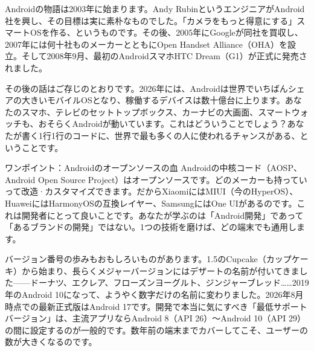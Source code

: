 


Androidの物語は2003年に始まります。Andy RubinというエンジニアがAndroid社を興し、その目標は実に素朴なものでした。「カメラをもっと得意にする」スマートOSを作る、というものです。その後、2005年にGoogleが同社を買収し、2007年には何十社ものメーカーとともにOpen Handset Alliance（OHA）を設立。そして2008年9月、最初のAndroidスマホHTC Dream（G1）が正式に発売されました。

その後の話はご存じのとおりです。2026年には、Androidは世界でいちばんシェアの大きいモバイルOSとなり、稼働するデバイスは数十億台に上ります。あなたのスマホ、テレビのセットトップボックス、カーナビの大画面、スマートウォッチも、おそらくAndroidが動いています。これはどういうことでしょう？あなたが書く1行1行のコードに、世界で最も多くの人に使われるチャンスがある、ということです。

\begin{tcbinfo}{ワンポイント：Androidのオープンソースの血}
Androidの中核コード（AOSP、Android Open Source Project）はオープンソースです。どのメーカーも持っていって改造·カスタマイズできます。だからXiaomiにはMIUI（今のHyperOS）、HuaweiにはHarmonyOSの互換レイヤー、SamsungにはOne UIがあるのです。これは開発者にとって良いことです。あなたが学ぶのは「Android開発」であって「あるブランドの開発」ではない。1つの技術を磨けば、どの端末でも通用します。

\end{tcbinfo}

バージョン番号の歩みもおもしろいものがあります。1.5のCupcake（カップケーキ）から始まり、長らくメジャーバージョンにはデザートの名前が付いてきました——ドーナツ、エクレア、フローズンヨーグルト、ジンジャーブレッド……2019年のAndroid 10になって、ようやく数字だけの名前に変わりました。2026年8月時点での最新正式版はAndroid 17です。開発で本当に気にすべき「最低サポートバージョン」は、主流アプリならAndroid 8（API 26）〜Android 10（API 29）の間に設定するのが一般的です。数年前の端末までカバーしてこそ、ユーザーの数が大きくなるのです。

